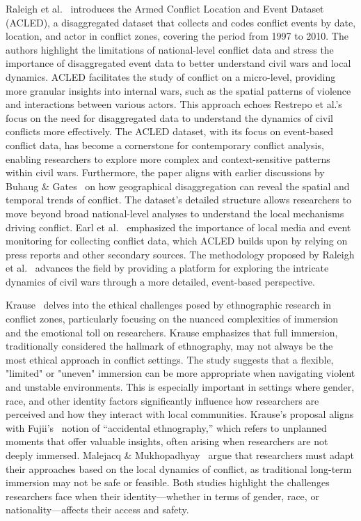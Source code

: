 \documentclass[conference]{IEEEtran}
\begin{document}
Raleigh et al.~\cite{b2} introduces the Armed Conflict Location and Event Dataset (ACLED), a disaggregated dataset that collects and codes conflict events by date, location, and actor in conflict zones, covering the period from 1997 to 2010. The authors highlight the limitations of national-level conflict data and stress the importance of disaggregated event data to better understand civil wars and local dynamics. ACLED facilitates the study of conflict on a micro-level, providing more granular insights into internal wars, such as the spatial patterns of violence and interactions between various actors. This approach echoes Restrepo et al.'s~\cite{b3} focus on the need for disaggregated data to understand the dynamics of civil conflicts more effectively. The ACLED dataset, with its focus on event-based conflict data, has become a cornerstone for contemporary conflict analysis, enabling researchers to explore more complex and context-sensitive patterns within civil wars. Furthermore, the paper aligns with earlier discussions by Buhaug \& Gates~\cite{b4} on how geographical disaggregation can reveal the spatial and temporal trends of conflict. The dataset's detailed structure allows researchers to move beyond broad national-level analyses to understand the local mechanisms driving conflict. Earl et al.~\cite{b5} emphasized the importance of local media and event monitoring for collecting conflict data, which ACLED builds upon by relying on press reports and other secondary sources. The methodology proposed by Raleigh et al.~\cite{b2} advances the field by providing a platform for exploring the intricate dynamics of civil wars through a more detailed, event-based perspective.

Krause~\cite{b6} delves into the ethical challenges posed by ethnographic research in conflict zones, particularly focusing on the nuanced complexities of immersion and the emotional toll on researchers. Krause emphasizes that full immersion, traditionally considered the hallmark of ethnography, may not always be the most ethical approach in conflict settings. The study suggests that a flexible, "limited" or "uneven" immersion can be more appropriate when navigating violent and unstable environments. This is especially important in settings where gender, race, and other identity factors significantly influence how researchers are perceived and how they interact with local communities. Krause's proposal aligns with Fujii's~\cite{b7} notion of “accidental ethnography,” which refers to unplanned moments that offer valuable insights, often arising when researchers are not deeply immersed. Malejacq \& Mukhopadhyay~\cite{b8} argue that researchers must adapt their approaches based on the local dynamics of conflict, as traditional long-term immersion may not be safe or feasible. Both studies highlight the challenges researchers face when their identity—whether in terms of gender, race, or nationality—affects their access and safety.
\end{document}
